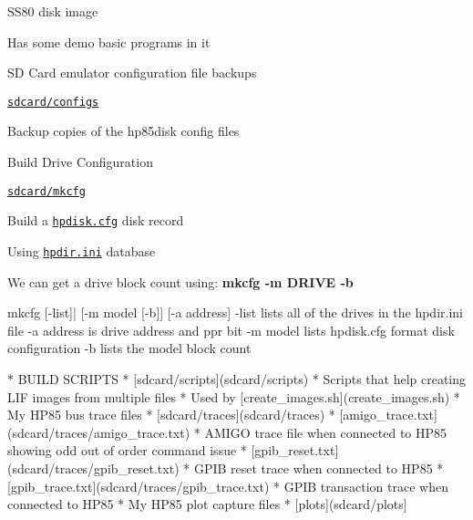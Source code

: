 \begin{DoxyItemize}
\begin{DoxyItemize}
\begin{DoxyItemize}
\begin{DoxyItemize}
\begin{DoxyItemize}
\item S\+S80 disk image
\item Has some demo basic programs in it
\end{DoxyItemize}
\end{DoxyItemize}
\item SD Card emulator configuration file backups
\begin{DoxyItemize}
\item \href{sdcard/configs}{\tt sdcard/configs}
\begin{DoxyItemize}
\item Backup copies of the hp85disk config files
\end{DoxyItemize}
\end{DoxyItemize}
\item Build Drive Configuration
\begin{DoxyItemize}
\item \href{sdcard/mkcfg}{\tt sdcard/mkcfg}
\begin{DoxyItemize}
\item Build a \href{sdcard/hpdisk.cfg}{\tt hpdisk.\+cfg} disk record
\begin{DoxyItemize}
\item Using \href{sdcard/notes/hpdir.ini}{\tt hpdir.\+ini} database
\begin{DoxyItemize}
\item We can get a drive block count using\+: {\bfseries mkcfg -\/m D\+R\+I\+VE -\/b} 
\begin{DoxyPre}
          mkcfg [-list]| [-m model [-b]] [-a address]
             -list lists all of the drives in the hpdir.ini file
             -a address is drive address and ppr bit
             -m model lists hpdisk.cfg format disk configuration
             -b lists the model block count
\end{DoxyPre}
 \begin{DoxyVerb}  * BUILD SCRIPTS
    * [sdcard/scripts](sdcard/scripts)
      * Scripts that help creating LIF images from multiple files
      * Used by [create_images.sh](create_images.sh)
  * My HP85 bus trace files
    * [sdcard/traces](sdcard/traces)
    * [amigo_trace.txt](sdcard/traces/amigo_trace.txt)
      * AMIGO trace file when connected to HP85 showing odd out of order command issue
    * [gpib_reset.txt](sdcard/traces/gpib_reset.txt)
      * GPIB reset trace when connected to HP85
    * [gpib_trace.txt](sdcard/traces/gpib_trace.txt)
      * GPIB transaction trace when connected to HP85
  * My HP85 plot capture files
    * [plots](sdcard/plots]

\end{DoxyVerb}
\end{DoxyItemize}
\end{DoxyItemize}
\end{DoxyItemize}
\end{DoxyItemize}
\end{DoxyItemize}
\end{DoxyItemize}
\end{DoxyItemize}
